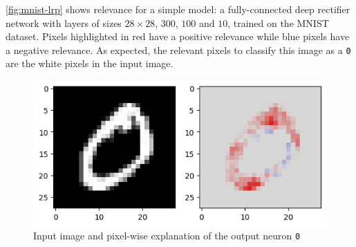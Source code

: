\documentclass{../cs-classes/cs-classes}
\newcommand*{\1}{\digitsbb{1}}
\newcommand*{\0}{\digitsbb{0}}
\begin{document}
\autoref{fig:mnist-lrp} shows relevance for a simple model: a fully-connected deep rectifier network with layers of sizes $28\times28$, $300$, $100$ and $10$, trained on the MNIST dataset. Pixels highlighted in red have a positive relevance while blue pixels have a negative relevance. As expected, the relevant pixels to classify this image as a \texttt{0} are the white pixels in the input image.

\begin{figure}[H]
    \centering
    \includegraphics[width=.5\textwidth]{mnist-lrp.png}
    \caption{Input image and pixel-wise explanation of the output neuron \texttt{0}}
    \label{fig:mnist-lrp}
\end{figure}
\end{document}
